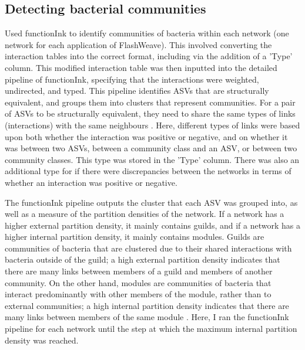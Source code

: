 \documentclass{article}
\begin{document}
\subsection{Detecting bacterial communities}
Used functionInk to identify communities of bacteria within each network (one network for each application of FlashWeave). This involved converting the interaction tables into the correct format, including via the addition of a 'Type' column. This modified interaction table was then inputted into the detailed pipeline of functionInk, specifying that the interactions were weighted, undirected, and typed. This pipeline identifies ASVs that are structurally equivalent, and groups them into clusters that represent communities. For a pair of ASVs to be structurally equivalent, they need to share the same types of links (interactions) with the same neighbours \citep{functionink}. Here, different types of links were based upon both whether the interaction was positive or negative, and on whether it was between two ASVs, between a community class and an ASV, or between two community classes. This type was stored in the 'Type' column. There was also an additional type for if there were discrepancies between the networks in terms of whether an interaction was positive or negative.

The functionInk pipeline outputs the cluster that each ASV was grouped into, as well as a measure of the partition densities of the network. If a network has a higher external partition density, it mainly contains guilds, and if a network has a higher internal partition density, it mainly contains modules. Guilds are communities of bacteria that are clustered due to their shared interactions with bacteria outside of the guild; a high external partition density indicates that there are many links between members of a guild and members of another community. On the other hand, modules are communities of bacteria that interact predominantly with other members of the module, rather than to external communities; a high internal partition density indicates that there are many links between members of the same module \citep{functionink}. Here, I ran the functionInk pipeline for each network until the step at which the maximum internal partition density was reached.
\end{document}
